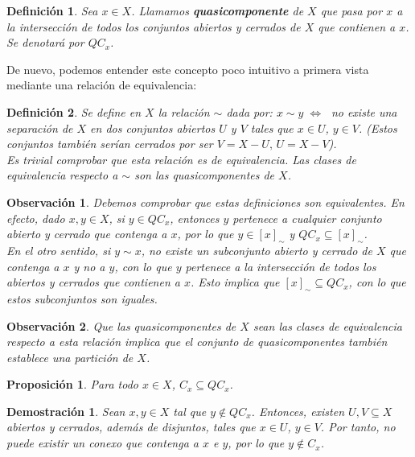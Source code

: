 \documentclass[12pt,twoside]{report}
\theoremstyle{azul}
\newtheorem*{propx}{Proposición}
\newtheorem*{demx}{Demostración}
\newtheorem*{defix}{Definición}
\theoremstyle{azul2}
\newtheorem*{obsx}{Observación}
\theoremstyle{plain}
\theoremstyle{definition}
\theoremstyle{remark}
\begin{document}
\begin{defix}
Sea $x \in X$. Llamamos \textbf{quasicomponente} de $X$ que pasa por $x$ a la intersección de todos los conjuntos abiertos y cerrados de $X$ que contienen a $x$. Se denotará por $QC_x$.
\end{defix}

De nuevo, podemos entender este concepto poco intuitivo a primera vista mediante una relación de equivalencia:

\begin{defix}
Se define en $X$ la relación $\sim$ dada por: $x \sim y \; \Leftrightarrow \;$ no existe una separación de $X$ en dos conjuntos abiertos $U$ y $V$ tales que $x \in U$, $y \in V$. (Estos conjuntos también serían cerrados por ser $V = X - U,\, U = X - V$).\\
Es trivial comprobar que esta relación es de equivalencia. Las clases de equivalencia respecto a $\sim$ son las quasicomponentes de $X$.
\end{defix}

\begin{obsx}
Debemos comprobar que estas definiciones son equivalentes. En efecto, dado $x, y \in X$, si $y \in QC_x$, entonces $y$ pertenece a cualquier conjunto abierto y cerrado que contenga a $x$, por lo que $y \in [x]_{\sim}$ y $QC_x \subseteq [x]_{\sim}$.\\
En el otro sentido, si $y \sim x$, no existe un subconjunto abierto y cerrado de $X$ que contenga a $x$ y no a $y$, con lo que $y$ pertenece a la intersección de todos los abiertos y cerrados que contienen a $x$. Esto implica que $[x]_{\sim} \subseteq QC_x$, con lo que estos subconjuntos son iguales.
\end{obsx}


\begin{obsx}
Que las quasicomponentes de $X$ sean las clases de equivalencia respecto a esta relación implica que el conjunto de quasicomponentes también establece una partición de $X$.
\end{obsx}

\begin{propx}
Para todo $x \in X$, $C_x \subseteq QC_x$.
\end{propx}
\begin{demx}
Sean $x, y \in X$ tal que $y \not\in QC_x$. Entonces, existen $U, V \subseteq X$ abiertos y cerrados, además de disjuntos, tales que $x \in U$, $y \in V$. Por tanto, no puede existir un conexo que contenga a $x$ e $y$, por lo que $y \not\in C_x$.
\end{demx}
\end{document}
